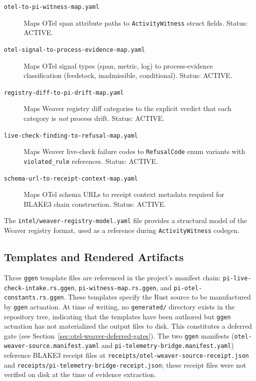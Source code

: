 \begin{description}
  \item[\texttt{otel-to-pi-witness-map.yaml}] Maps OTel span attribute paths to
    \texttt{ActivityWitness} struct fields. Status: ACTIVE.
  \item[\texttt{otel-signal-to-process-evidence-map.yaml}] Maps OTel signal types
    (span, metric, log) to process-evidence classification (feedstock, inadmissible,
    conditional). Status: ACTIVE.
  \item[\texttt{registry-diff-to-pi-drift-map.yaml}] Maps Weaver registry diff categories
    to the explicit verdict that each category is \emph{not} process drift. Status: ACTIVE.
  \item[\texttt{live-check-finding-to-refusal-map.yaml}] Maps Weaver live-check failure
    codes to \texttt{RefusalCode} enum variants with \texttt{violated\_rule} references.
    Status: ACTIVE.
  \item[\texttt{schema-url-to-receipt-context-map.yaml}] Maps OTel schema URLs to receipt
    context metadata required for BLAKE3 chain construction. Status: ACTIVE.
\end{description}

The \texttt{intel/weaver-registry-model.yaml} file provides a structural model of the Weaver
registry format, used as a reference during \texttt{ActivityWitness} codegen.

\subsection{Templates and Rendered Artifacts}
\label{sec:otel-weaver-impl-templates}

Three \texttt{ggen} template files are referenced in the project's manifest chain:
\texttt{pi-live-check-intake.rs.ggen}, \texttt{pi-witness-map.rs.ggen}, and
\texttt{pi-otel-constants.rs.ggen}. These templates specify the Rust source to be manufactured
by \texttt{ggen} actuation. At time of writing, no \texttt{generated/} directory exists in the
repository tree, indicating that the templates have been authored but \texttt{ggen} actuation
has not materialized the output files to disk. This constitutes a deferred gate (see
Section~\ref{sec:otel-weaver-deferred-gates}). The two \texttt{ggen} manifests
(\texttt{otel-weaver-source.manifest.yaml} and \texttt{pi-telemetry-bridge.manifest.yaml})
reference BLAKE3 receipt files at \texttt{receipts/otel-weaver-source-receipt.json} and
\texttt{receipts/pi-telemetry-bridge-receipt.json}; these receipt files were not verified on
disk at the time of evidence extraction.
